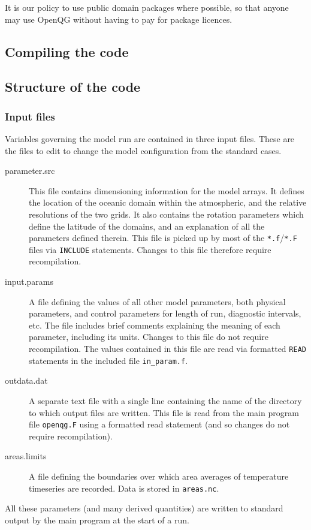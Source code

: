 \documentclass[11pt, a4paper,twoside]{article}
\numberwithin{equation}{section}
\begin{document}
It is our policy to use public domain packages where possible, so that anyone may use OpenQG without having to pay for package licences.

\subsection{Compiling the code}\label{sub:compiling}

\subsection{Structure of the code}

\subsubsection{Input files}
Variables governing the model run are contained in three input files.
These are the files to edit to change the model configuration from the standard cases.

\begin{description}
\item[parameter.src]  This file contains dimensioning information for the model arrays. It defines the location of the oceanic domain within the atmospheric, and the relative resolutions of the two grids.
It also contains the rotation parameters which define the latitude of the domains, and an explanation of all the parameters defined therein.
This file is picked up by most of the \verb=*.f=/\verb=*.F= files via \verb=INCLUDE= statements.
Changes to this file therefore require recompilation.
\item[input.params]   A file defining the values of all other model  parameters, both physical parameters, and control parameters for length of run, diagnostic intervals, etc.
The file includes brief comments explaining the meaning of each parameter, including its units.
Changes to this file do not require recompilation.
The values contained in this file are read via formatted \verb=READ= statements in the included file \verb=in_param.f=.
\item[outdata.dat] A separate text file with a single line containing the name of the directory to which output files are written.
This file is read from the main program file \verb=openqg.F= using a formatted read statement (and so changes do not require recompilation).
\item[areas.limits]   A file defining the boundaries over which area averages of temperature timeseries are recorded. Data is stored in \verb=areas.nc=.
\end{description}
All these parameters (and many derived quantities) are written to standard output by the main program at the start of a run.
\end{document}
